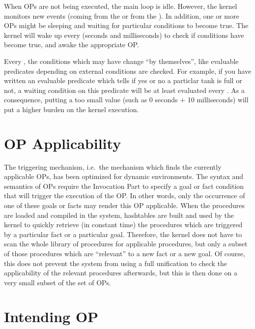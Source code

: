 When OPs are not being executed, the main loop is idle. However, the
kernel monitors new events (coming from the \MPA{} or from the
\OPRSS{}). In addition, one or more OPs might be sleeping and waiting for particular 
conditions to become true. The \OPRSS{} kernel will wake up
every  (seconds and
milliseconds) to check if conditions have become true, and awake the appropriate OP.

Every , the conditions which may have change ``by themselves'',
like evaluable predicates depending on external conditions are checked. For
example, if you have written an evaluable predicate which tells if yes or no a
particlar tank is full or not, a waiting condition on this predicate will be at
least evaluated every . As a
consequence, putting a too small value (such as 0 seconds + 10 milliseconds)
will put a higher burden on the kernel execution.

\section{OP Applicability}

The triggering mechanism, i.e.\  the mechanism which finds the currently
applicable OPs, has been optimized for dynamic environments. The syntax and semantics
of OPs require the Invocation Part to specify a goal or fact condition that will trigger the 
execution of the OP. In other words, only the occurrence of one of
these goals or facts may render this OP applicable. When the procedures are
loaded and compiled in the system, hashtables are built and
used by the kernel to quickly retrieve (in constant time) the
procedures which are triggered by a particular fact or a particular goal.
Therefore, the kernel does not have to scan the whole library of procedures
for applicable procedures, but only a subset of those procedures which are
``relevant'' to a new fact or a new goal. Of course, this does not prevent
the system from using a full unification to check the applicability of the
relevant procedures afterwards, but this is then done on a very small
subset of the set of OPs.

\section{Intending OP}

